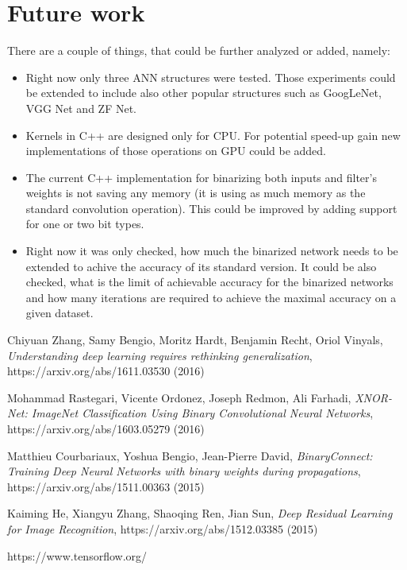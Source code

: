 \documentclass[licencjacka]{pracamgr}
\begin{document}
	\section{Future work}
		There are a couple of things, that could be further analyzed or added, namely:
		\begin{itemize}
			\item Right now only three ANN structures were tested. Those experiments could be extended to include also other popular structures such as GoogLeNet, VGG Net and ZF Net.
			\item Kernels in C++ are designed only for CPU. For potential speed-up gain new implementations of those operations on GPU could be added. 
			\item The current C++ implementation for binarizing both inputs and filter's weights is not saving any memory (it is using as much memory as the standard convolution operation). This could be improved by adding support for one or two bit types. 
			\item Right now it was only checked, how much the binarized network needs to be extended to achive the accuracy of its standard version. It could be also checked, what is the limit of achievable accuracy for the binarized networks and how many iterations are required to achieve the maximal accuracy on a given dataset.
		\end{itemize} 


\begin{thebibliography}{99}

 Chiyuan Zhang, Samy Bengio, Moritz Hardt, Benjamin Recht, Oriol Vinyals, \textit{Understanding deep learning requires rethinking generalization}, https://arxiv.org/abs/1611.03530 (2016)

 Mohammad Rastegari, Vicente Ordonez, Joseph Redmon, Ali Farhadi, \textit{XNOR-Net: ImageNet Classification Using Binary Convolutional Neural Networks}, https://arxiv.org/abs/1603.05279 (2016)

 Matthieu Courbariaux, Yoshua Bengio, Jean-Pierre David, \textit{BinaryConnect: Training Deep Neural Networks with binary weights during propagations}, https://arxiv.org/abs/1511.00363 (2015)

 Kaiming He, Xiangyu Zhang, Shaoqing Ren, Jian Sun, \textit{Deep Residual Learning for Image Recognition}, https://arxiv.org/abs/1512.03385 (2015)

 https://www.tensorflow.org/

\end{thebibliography}
\end{document}
